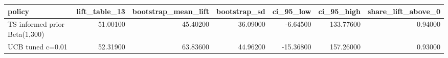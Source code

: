 \begin{tabular}{lrrrrrr}
\toprule
policy & lift\_table\_13 & bootstrap\_mean\_lift & bootstrap\_sd & ci\_95\_low & ci\_95\_high & share\_lift\_above\_0 \\
\midrule
TS informed prior Beta(1,300) & 51.00100 & 45.40200 & 36.09000 & -6.64500 & 133.77600 & 0.94000 \\
UCB tuned c=0.01 & 52.31900 & 63.83600 & 44.96200 & -15.36800 & 157.26000 & 0.93000 \\
\bottomrule
\end{tabular}

